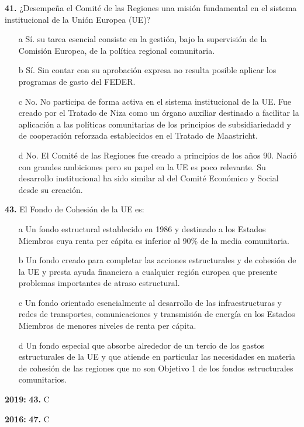 \documentclass{nuevotema}
\begin{document}
\textbf{41.} ¿Desempeña el Comité de las Regiones una misión fundamental en el sistema institucional de la Unión Europea (UE)?
\begin{itemize}
	\item[a] Sí. su tarea esencial consiste en la gestión, bajo la supervisión de la Comisión Europea, de la política regional comunitaria.
	\item[b] Sí. Sin contar con su aprobación expresa no resulta posible aplicar los programas de gasto del FEDER.
	\item[c] No. No participa de forma activa en el sistema institucional de la UE. Fue creado por el Tratado de Niza como un órgano auxiliar destinado a facilitar la aplicación a las políticas comunitarias de los principios de subsidiariedadd y de cooperación reforzada establecidos en el Tratado de Maastricht.
	\item[d] No. El Comité de las Regiones fue creado a principios de los años 90. Nació con grandes ambiciones pero su papel en la UE es poco relevante. Su desarrollo institucional ha sido similar al del Comité Económico y Social desde su creación.
\end{itemize}

\textbf{43.} El Fondo de Cohesión de la UE es:
\begin{itemize}
	\item[a] Un fondo estructural establecido en 1986 y destinado a los Estados Miembros cuya renta per cápita es inferior al 90\% de la media comunitaria.
	\item[b] Un fondo creado para completar las acciones estructurales y de cohesión de la UE y presta ayuda financiera a cualquier región europea que presente problemas importantes de atraso estructural.
	\item[c] Un fondo orientado esencialmente al desarrollo de las infraestructuras y redes de transportes, comunicaciones y transmisión de energía en los Estados Miembros de menores niveles de renta per cápita. 
	\item[d] Un fondo especial que absorbe alrededor de un tercio de los gastos estructurales de la UE y que atiende en particular las necesidades en materia de cohesión de las regiones que no son Objetivo 1 de los fondos estructurales comunitarios.
\end{itemize}

\notas

\textbf{2019:} \textbf{43.} C

\textbf{2016:} \textbf{47.} C
\end{document}

